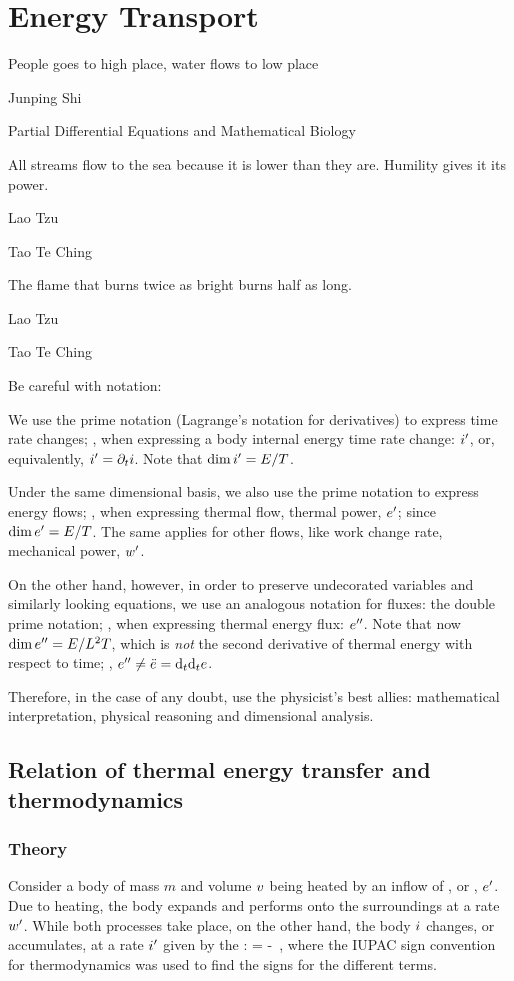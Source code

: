 \section{Energy Transport}
\epigraph{People goes to high place, water flows to low place}{Junping Shi}
    {Partial Differential Equations and Mathematical Biology}
\epigraph{All streams flow to the sea because it is lower than they are. Humility gives it its power.}{Lao Tzu}{Tao Te Ching}
\epigraph{The flame that burns twice as bright burns half as long.}{Lao Tzu}{Tao Te Ching}

Be careful with notation:

\begin{caution}
We use the prime notation (Lagrange's notation for derivatives) to express time rate changes; \eg, when expressing a body internal energy time rate change: ${i}^{\prime}$, or, equivalently, ${i}^{\prime} = \partial_{t}i$. Note that $\dim{i}^{\prime} = E/T$.

Under the same dimensional basis, we also use the prime notation to express energy flows; \eg, when expressing thermal flow, \aka thermal power, ${e}^{\prime}$; since $\dim{e}^{\prime} = E/T$. The same applies for other flows, like work change rate, \aka mechanical power, ${w}^{\prime}$.

On the other hand, however, in order to preserve undecorated variables and similarly looking equations, we use an analogous notation for fluxes: the double prime notation; \eg, when expressing thermal energy flux: ${e}^{\prime\prime}$. Note that now $\dim{e}^{\prime\prime} = E/L^2T$, which is \emph{not} the second derivative of thermal energy with respect to time; \ie, ${e}^{\prime\prime} \neq \ddot{e} = \text{d}_{t}{\text{d}_{t}e}$.

Therefore, in the case of any doubt, use the physicist's best allies: mathematical interpretation, physical reasoning and dimensional analysis.
\end{caution}


\subsection{Relation of thermal energy transfer and thermodynamics}

\subsubsection{Theory}
Consider a body of mass $m$ and volume $v$ being heated by an inflow of , \aka {} or , ${e}^{\prime}$. Due to heating, the body expands and performs  onto the surroundings at a rate ${w}^{\prime}$. While both processes take place, on the other hand, the body  $i$ changes, or accumulates, at a rate ${i}^{\prime}$ given by the :
\beq
\rate\ien = \flow\then - \flow\work\,,
\eeq
where the IUPAC sign convention for thermodynamics was used to find the signs for the different terms.

